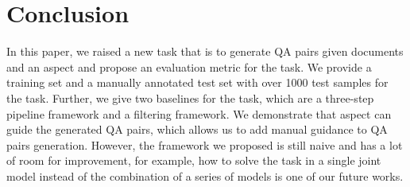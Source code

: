 \section{Conclusion}
\label{sec:conclusion}
In this paper, we raised a new task that is to generate QA pairs given documents and an aspect and propose an evaluation metric for the task. We provide a training set and a manually annotated test set with over 1000 test samples for the task. Further, we give two baselines for the task, which are a three-step pipeline framework and a filtering framework. We demonstrate that aspect can guide the generated QA pairs, which allows us to add manual guidance to QA pairs generation. However, the framework we proposed is still naive and has a lot of room for improvement, for example, how to solve the task in a single joint model instead of the combination of a series of models is one of our future works.